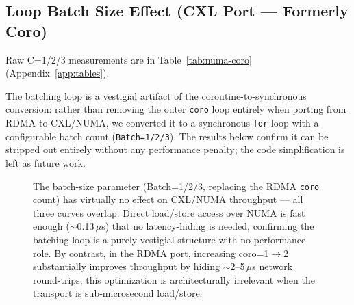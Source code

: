 \documentclass[conference]{IEEEtran}
\begin{document}
\subsection{Loop Batch Size Effect (CXL Port --- Formerly Coro)}

Raw C=1/2/3 measurements are in Table~\ref{tab:numa-coro} (Appendix~\ref{app:tables}).

The batching loop is a vestigial artifact of the coroutine-to-synchronous conversion: rather than removing the outer \texttt{coro} loop entirely when porting from RDMA to CXL/NUMA, we converted it to a synchronous \texttt{for}-loop with a configurable batch count (\texttt{Batch=1/2/3}). The results below confirm it can be stripped out entirely without any performance penalty; the code simplification is left as future work.

\begin{figure}[H]
\centering
{}
\caption{The batch-size parameter (Batch=1/2/3, replacing the RDMA \texttt{coro} count) has virtually no effect on CXL/NUMA throughput --- all three curves overlap. Direct load/store access over NUMA is fast enough ($\sim$0.13\,$\mu$s) that no latency-hiding is needed, confirming the batching loop is a purely vestigial structure with no performance role. By contrast, in the RDMA port, increasing coro=1$\to$2 substantially improves throughput by hiding $\sim$2--5\,$\mu$s network round-trips; this optimization is architecturally irrelevant when the transport is sub-microsecond load/store.}
\label{fig:numa-coro}
\end{figure}
\end{document}
